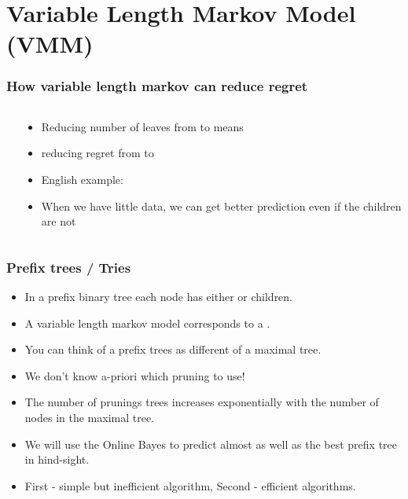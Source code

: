 \documentclass{beamer}
\begin{document}
\section{Variable Length Markov Model (VMM)}


\begin{frame}
\frametitle{How variable length markov can reduce regret}
\begin{columns}
\begin{column}[T]{5cm}
\end{column}
\begin{column}[t]{8cm}
\begin{itemize}
\item Reducing number of leaves from  to  means 
\item reducing regret from  to 
\item English example: \\
\pause {} \pause {}
\item When we have little data, we can get better prediction even if the children are not 
\end{itemize}
\end{column}
\end{columns}
\end{frame}

\begin{frame}
\frametitle{Prefix trees / Tries}
\begin{itemize}
\item In a prefix binary tree each node has either  or  children.
\item A variable length markov model corresponds to a .
\item You can think of a prefix trees as different  of a
  maximal tree.
\item We don't know a-priori which pruning to use!
\item The number of prunings trees increases exponentially with the
  number of nodes in the maximal tree.
\item We will use the Online Bayes to predict almost as well as the
  best prefix tree in hind-sight.
\item First - simple but inefficient algorithm, Second - efficient algorithms.
\end{itemize}
\end{frame}
\end{document}
